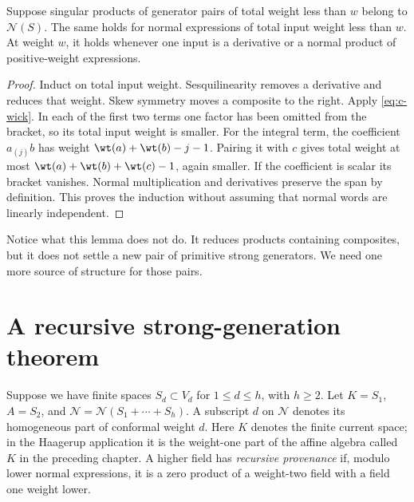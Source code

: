 \begin{lemma}\label{lem:c-filtered-wick}
Suppose singular products of generator pairs of total weight less than
$w$ belong to $\mathcal N(S)$. The same holds for normal expressions
of total input weight less than $w$. At weight $w$, it holds whenever
one input is a derivative or a normal product of positive-weight
expressions.
\end{lemma}
\begin{proof}
Induct on total input weight. Sesquilinearity removes a derivative and
reduces that weight. Skew symmetry moves a composite to the right.
Apply \eqref{eq:c-wick}. In each of the first two terms one factor
has been omitted from the bracket, so its total input weight is smaller.
For the integral term, the coefficient $a_{(j)}b$ has weight
$\wt(a)+\wt(b)-j-1$. Pairing it with $c$ gives total weight at
most $\wt(a)+\wt(b)+\wt(c)-1$, again smaller. If the coefficient
is scalar its bracket vanishes. Normal multiplication and derivatives
preserve the span by definition. This proves the induction without
assuming that normal words are linearly independent.
\end{proof}

Notice what this lemma does not do. It reduces products containing
composites, but it does not settle a new pair of primitive strong
generators. We need one more source of structure for those pairs.

\section{A recursive strong-generation theorem}

Suppose we have finite spaces $S_d\subset V_d$ for $1\leq d\leq h$,
with $h\geq2$. Let $K=S_1$, $A=S_2$, and
$\mathcal N=\mathcal N(S_1+\cdots+S_h)$. A subscript $d$ on
$\mathcal N$ denotes its homogeneous part of conformal weight $d$.
Here $K$ denotes the
finite current space; in the Haagerup application it is the weight-one
part of the affine algebra called $K$ in the preceding chapter.
A higher field has
\emph{recursive provenance} if, modulo lower normal expressions, it is
a zero product of a weight-two field with a field one weight lower.

